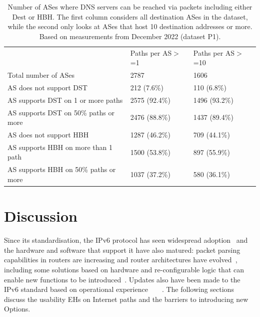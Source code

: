 \documentclass[conference]{IEEEtran}
\begin{document}
    \begin{table}
\begin{tabular}{p{}|p{}p{}}
                                          & Paths per AS$>$=1 & Paths per AS$>$=10 \\ \cline{1-3} 
Total number of ASes                      & 2787                                            & 1606                                            \\ \hline
AS does not support DST               & 212 (7.6\%)                                     & 110 (6.8\%)                                     \\
AS supports DST on 1 or more paths   & 2575 (92.4\%)                                   & 1496 (93.2\%)                                   \\
AS supports DST on 50\% paths or more & 2476  (88.8\%)                                  & 1437 (89.4\%)                                   \\ \hline
AS does not support HBH               & 1287 (46.2\%)                                   & 709 (44.1\%)                                    \\
AS supports HBH on more than 1 path   & 1500 (53.8\%)                                   & 897 (55.9\%)                                    \\
AS supports HBH on 50\% paths or more & 1037 (37.2\%)                                   & 580 (36.1\%)                                   
\end{tabular}
\label{tbl:as_pathspider}
\caption{Number of ASes where DNS servers can be reached via packets including either Dest or HBH. The first column considers all destination ASes in the dataset, while the second only looks at ASes that host 10 destination addresses or more. Based on measurements from December 2022 (dataset P1).}
\end{table}

\section{Discussion} 
\label{sec:discussion}

Since its standardisation, the IPv6 protocol has
seen widespread adoption~\cite{v6adoption_ton} and the hardware and software that
support it have also matured: packet parsing capabilities in routers are increasing and
router architectures have evolved~\cite{metamorphosis, hauser2023}, including some solutions based on hardware and re-configurable
logic that can enable new functions to be introduced~\cite{cisco-silicon-one}. Updates also have been made to the IPv6 standard based on operational experience~\cite{RFC5722}~\cite{RFC6946}~\cite{RFC6564}~\cite{RFC8200}.
The following sections discuss the usability EHs on Internet paths and the barriers to introducing new Options.
\end{document}
